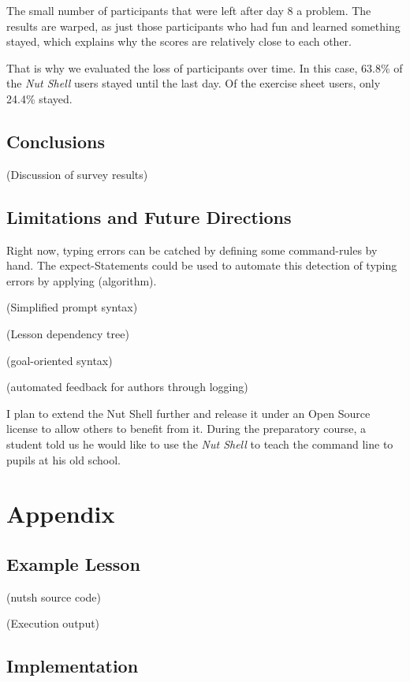 \documentclass[paper=a4,twoside,abstract=on,cleardoublepage=empty,numbers=noenddot,toc=bib,12pt]{scrreprt}
\begin{document}
The small number of participants that were left after day 8 a problem. The results are warped, as just those participants who had fun and learned something stayed, which explains why the scores are relatively close to each other.

That is why we evaluated the loss of participants over time. In this case, 63.8\% of the \emph{Nut Shell} users stayed until the last day. Of the exercise sheet users, only 24.4\% stayed.

\chapter{Conclusions}

(Discussion of survey results)

\chapter{Limitations and Future Directions}

Right now, typing errors can be catched by defining some command-rules by hand. The expect-Statements could be used to automate this detection of typing errors by applying (algorithm).

    (Simplified prompt syntax)

    (Lesson dependency tree)

    (goal-oriented syntax)

    (automated feedback for authors through logging)

    I plan to extend the Nut Shell further and release it under an Open Source license to allow others to benefit from it. During the preparatory course, a student told us he would like to use the \emph{Nut Shell} to teach the command line to pupils at his old school.

\cleardoublepage
\part*{Appendix}
\appendix

\chapter{Example Lesson}
\label{sec:nutshexample}

(nutsh source code)

(Execution output)

\chapter{Implementation}
\end{document}
